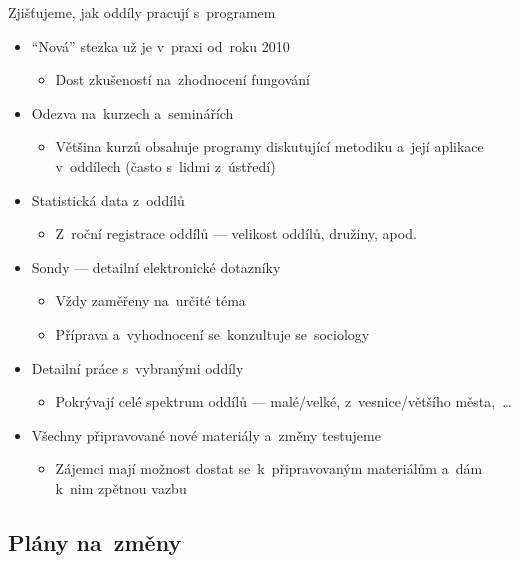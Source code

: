 \documentclass[compress, ucs, xelatex, 11pt, xcolor=dvipsnames, print,
	hyperref={
		bookmarks=true,
		unicode=true,
		colorlinks=true,
		pdftitle={Skautska vychovna metoda},
		plainpages=false,
		pdfauthor={Vojtech Zeisek},
		pdfsubject={Skautska vychovna metoda a jeji vyvoj za posledni stoleti a desetileti},
		pdfcreator={XeLaTeX},
		pdfkeywords={Junak, Pedagogika, Skaut, Skauting, Vychovna metoda},
		linkcolor=Black,
		anchorcolor=Black,
		citecolor=OliveGreen,
		filecolor=OliveGreen,
		menucolor=Black,
		urlcolor=OliveGreen,
		pdftex},
	url={hyphens, lowtilde} %
	]{beamer}
\begin{document}
\begin{frame}{Zjišťujeme, jak oddíly pracují s~programem}
	\begin{itemize}
		\item \enquote{Nová} stezka už je v~praxi od~roku 2010
		\begin{itemize}
			\item Dost zkušeností na~zhodnocení fungování
		\end{itemize}
		\item Odezva na~kurzech a~seminářích
		\begin{itemize}
			\item Většina kurzů obsahuje programy diskutující metodiku a~její aplikace v~oddílech (často s~lidmi z~ústředí)
		\end{itemize}
		\item Statistická data z~oddílů
		\begin{itemize}
			\item Z~roční registrace oddílů --- velikost oddílů, družiny, apod.
		\end{itemize}
		\item Sondy --- detailní elektronické dotazníky
		\begin{itemize}
			\item Vždy zaměřeny na~určité téma
			\item Příprava a~vyhodnocení se~konzultuje se~sociology
		\end{itemize}
		\item Detailní práce s~vybranými oddíly
		\begin{itemize}
			\item Pokrývají celé spektrum oddílů --- malé/velké, z~vesnice/většího města,~\ldots
		\end{itemize}
		\item Všechny připravované nové materiály a~změny testujeme
		\begin{itemize}
			\item Zájemci mají možnost dostat se~k~připravovaným materiálům a~dám k~nim zpětnou vazbu
		\end{itemize}
	\end{itemize}
\end{frame}

\subsection{Plány na~změny}
\end{document}
